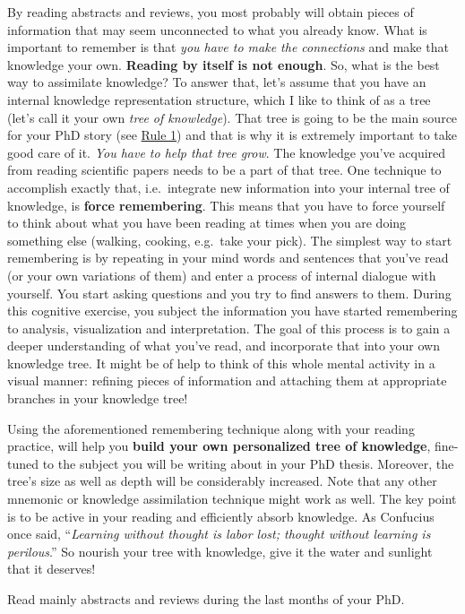 \documentclass[
  12pt,
  oneside]{book}
\begin{document}
By reading abstracts and reviews, you most probably will obtain pieces of information that may seem unconnected to what you already know.
What is important to remember is that \emph{you have to make the connections} and make that knowledge your own.
\textbf{Reading by itself is not enough}.
So, what is the best way to assimilate knowledge?
To answer that, let's assume that you have an internal knowledge representation structure, which I like to think of as a tree (let's call it your own \emph{tree of knowledge}).
That tree is going to be the main source for your PhD story (see \protect\hyperlink{rule1}{Rule 1}) and that is why it is extremely important to take good care of it.
\emph{You have to help that tree grow}.
The knowledge you've acquired from reading scientific papers needs to be a part of that tree.
One technique to accomplish exactly that, i.e.~integrate new information into your internal tree of knowledge, is \textbf{force remembering}.
This means that you have to force yourself to think about what you have been reading at times when you are doing something else (walking, cooking, e.g.~take your pick).
The simplest way to start remembering is by repeating in your mind words and sentences that you've read (or your own variations of them) and enter a process of internal dialogue with yourself.
You start asking questions and you try to find answers to them.
During this cognitive exercise, you subject the information you have started remembering to analysis, visualization and interpretation.
The goal of this process is to gain a deeper understanding of what you've read, and incorporate that into your own knowledge tree.
It might be of help to think of this whole mental activity in a visual manner: refining pieces of information and attaching them at appropriate branches in your knowledge tree!

Using the aforementioned remembering technique along with your reading practice, will help you \textbf{build your own personalized tree of knowledge}, fine-tuned to the subject you will be writing about in your PhD thesis.
Moreover, the tree's size as well as depth will be considerably increased.
Note that any other mnemonic or knowledge assimilation technique might work as well.
The key point is to be active in your reading and efficiently absorb knowledge.
As Confucius once said, ``\emph{Learning without thought is labor lost; thought without learning is perilous}.''
So nourish your tree with knowledge, give it the water and sunlight that it deserves!

Read mainly abstracts and reviews during the last months of your PhD.
\end{document}
